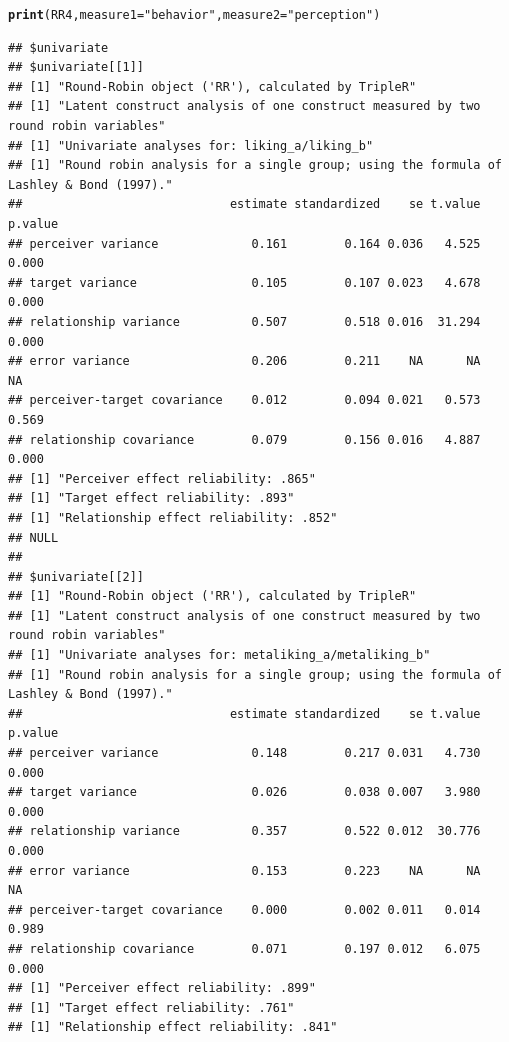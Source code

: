 \documentclass[a4paper]{article}\usepackage[]{graphicx}\usepackage[]{color}
\makeatletter
\newcommand{\hlstr}[1]{\textcolor[rgb]{0.192,0.494,0.8}{#1}}%
\newcommand{\hlstd}[1]{\textcolor[rgb]{0.345,0.345,0.345}{#1}}%
\newcommand{\hlkwc}[1]{\textcolor[rgb]{0.333,0.667,0.333}{#1}}%
\newcommand{\hlkwd}[1]{\textcolor[rgb]{0.737,0.353,0.396}{\textbf{#1}}}%
\newenvironment{kframe}{%
 \def\at@end@of@kframe{}%
 \ifinner\ifhmode%
  \def\at@end@of@kframe{\end{minipage}}%
  \begin{minipage}{\columnwidth}%
 \fi\fi%
 \def\FrameCommand##1{\hskip\@totalleftmargin \hskip-\fboxsep
 \colorbox{shadecolor}{##1}\hskip-\fboxsep
     \hskip-\linewidth \hskip-\@totalleftmargin \hskip\columnwidth}%
 \MakeFramed {\advance\hsize-\width
   \@totalleftmargin\z@ \linewidth\hsize
   \@setminipage}}%
 {\par\unskip\endMakeFramed%
 \at@end@of@kframe}
\newenvironment{knitrout}{}{} %
\makeatother
\begin{document}
\par\vspace{5mm}

\begin{knitrout}\small
{}\color{fgcolor}\begin{kframe}
\begin{alltt}
\hlkwd{print}\hlstd{(RR4,} \hlkwc{measure1} \hlstd{=} \hlstr{"behavior"}\hlstd{,} \hlkwc{measure2} \hlstd{=} \hlstr{"perception"}\hlstd{)}
\end{alltt}
\begin{verbatim}
## $univariate
## $univariate[[1]]
## [1] "Round-Robin object ('RR'), calculated by TripleR"
## [1] "Latent construct analysis of one construct measured by two round robin variables"
## [1] "Univariate analyses for: liking_a/liking_b"
## [1] "Round robin analysis for a single group; using the formula of Lashley & Bond (1997)."
##                             estimate standardized    se t.value p.value
## perceiver variance             0.161        0.164 0.036   4.525   0.000
## target variance                0.105        0.107 0.023   4.678   0.000
## relationship variance          0.507        0.518 0.016  31.294   0.000
## error variance                 0.206        0.211    NA      NA      NA
## perceiver-target covariance    0.012        0.094 0.021   0.573   0.569
## relationship covariance        0.079        0.156 0.016   4.887   0.000
## [1] "Perceiver effect reliability: .865"
## [1] "Target effect reliability: .893"
## [1] "Relationship effect reliability: .852"
## NULL
## 
## $univariate[[2]]
## [1] "Round-Robin object ('RR'), calculated by TripleR"
## [1] "Latent construct analysis of one construct measured by two round robin variables"
## [1] "Univariate analyses for: metaliking_a/metaliking_b"
## [1] "Round robin analysis for a single group; using the formula of Lashley & Bond (1997)."
##                             estimate standardized    se t.value p.value
## perceiver variance             0.148        0.217 0.031   4.730   0.000
## target variance                0.026        0.038 0.007   3.980   0.000
## relationship variance          0.357        0.522 0.012  30.776   0.000
## error variance                 0.153        0.223    NA      NA      NA
## perceiver-target covariance    0.000        0.002 0.011   0.014   0.989
## relationship covariance        0.071        0.197 0.012   6.075   0.000
## [1] "Perceiver effect reliability: .899"
## [1] "Target effect reliability: .761"
## [1] "Relationship effect reliability: .841"

\end{verbatim}
\end{kframe}
\end{knitrout}
\end{document}

